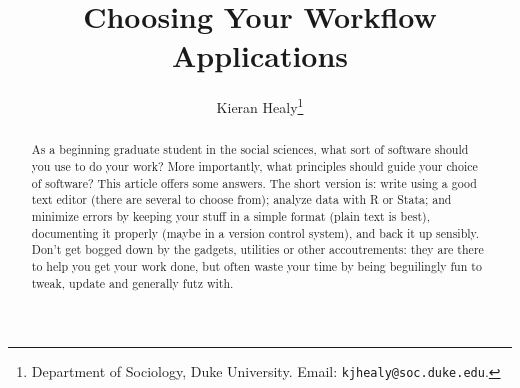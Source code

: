 \documentclass[11pt,article]{memoir}
\begin{document}
\pagestyle{kjh}

\setsansfont[Mapping=tex-text]{Myriad Pro} 
\setmonofont[Mapping=tex-text,Scale=0.9]{Inconsolata} 

\title{Choosing Your Workflow Applications}

\author{Kieran Healy\thanks{Department of Sociology, Duke University. Email: \texttt{{\footnotesize kjhealy@soc.duke.edu}}.}}

\date{}


\maketitle

%  


\thispagestyle{kjhgit}
 
\begin{abstract}
	As a beginning graduate student in the social sciences, what sort of software should you use to do your work? More importantly, what principles should guide your choice of software? This article offers some answers. The short version is: write using a good text editor (there are several to choose from); analyze data with R or Stata; and minimize errors by keeping your stuff in a simple format (plain text is best), documenting it properly (maybe in a version control system), and back it up sensibly. Don't get bogged down by the gadgets, utilities or other accoutrements: they are there to help you get your work done, but often  waste your time by being beguilingly fun to tweak, update and generally futz with.  
\end{abstract}
\end{document}
